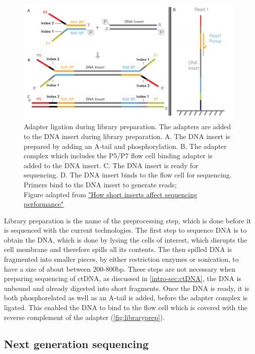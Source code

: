 \begin{figure}[!ht]
\centering
\includegraphics[width=.9\linewidth]{Figures/LibraryPreparation.png}
\caption[Library preparation for NGS]{Adapter ligation during library preparation. The adapters are added to the DNA insert during library preparation. A. The DNA insert is prepared by adding an A-tail and phosphorylation. B. The adapter complex which includes the P5/P7 flow cell binding adapter is added to the DNA insert. C. The DNA insert is ready for sequencing. D. The DNA insert binds to the flow cell for sequencing. Primers bind to the DNA insert to generate reads; \\Figure adapted from \href{https://sapac.support.illumina.com/bulletins/2020/12/how-short-inserts-affect-sequencing-performance.html}{"How short inserts affect sequencing performance"}\protect\cite{Illumina2020}}\label{fig:libraryprep}
\end{figure}

Library preparation is the name of the preprocessing step, which is done before it is sequenced with the current technologies. The first step to sequence DNA is to obtain the DNA, which is done by lysing the cells of interest, which disrupts the cell membrane and therefore spills all its contents. The then spilled DNA is fragmented into smaller pieces, by either restriction enzymes or sonication, to have a size of about between 200-800bp. These steps are not necessary when preparing sequencing of ctDNA, as discussed in \autoref{intro-sec:ctDNA}, the DNA is unbound and already digested into short fragments.
Once the DNA is ready, it is both phosphorelated as well as an A-tail is added, before the adapter complex is ligated. This enabled the DNA to bind to the flow cell which is covered with the reverse complement of the adapter (\autoref{fig:libraryprep}). 

\subsection{Next generation sequencing}
\label{intro-sec:ngs}

